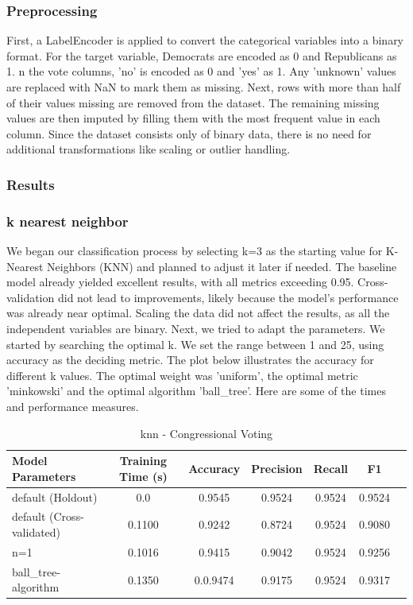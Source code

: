 \documentclass{article}
\begin{document}
\subsubsection{Preprocessing}
First, a LabelEncoder is applied to convert the categorical variables into a binary format.  For the target variable, Democrats are encoded as 0 and Republicans as 1.  n the vote columns, 'no' is encoded as 0 and 'yes' as 1. Any 'unknown' values are replaced with NaN to mark them as missing. Next, rows with more than half of their values missing are removed from the dataset. The remaining missing values are then imputed by filling them with the most frequent value in each column. Since the dataset consists only of binary data, there is no need for additional transformations like scaling or outlier handling. 


\subsubsection{Results}
\subsubsection*{k nearest neighbor}
We began our classification process by selecting k=3 as the starting value for K-Nearest Neighbors (KNN) and planned to adjust it later if needed. The baseline model already yielded excellent results, with all metrics exceeding 0.95. Cross-validation did not lead to improvements, likely because the model's performance was already near optimal. Scaling the data did not affect the results, as all the independent variables are binary. 
Next, we tried to adapt the parameters. We started by searching the optimal k. We set the range between 1 and 25, using accuracy as the deciding metric. The plot below illustrates the accuracy for different k values. The optimal weight was 'uniform', the optimal metric 'minkowski' and the optimal algorithm 'ball\_tree'.
Here are some of the times and performance measures.
\begin{table}[ht]
\centering
\begin{tabular}{l|c|c|c|c|c|c}
\textbf{Model Parameters} & \textbf{Training Time (s)} & \textbf{Accuracy} & \textbf{Precision} & \textbf{Recall} & \textbf{F1} \\\hline
default (Holdout) & 0.0 & 0.9545 & 0.9524 & 0.9524 & 0.9524 \\
default (Cross-validated) & 0.1100  & 0.9242 & 0.8724 & 0.9524 & 0.9080\\
n=1 & 0.1016  & 0.9415 & 0.9042 & 0.9524 & 0.9256 \\
ball\_tree-algorithm & 0.1350  & 0.0.9474 & 0.9175 &0.9524 & 0.9317 \\
\end{tabular}
\caption{knn - Congressional Voting}
\label{tab:Random Forest - Congressional Voting}
\end{table}
\end{document}
